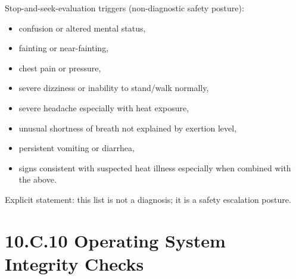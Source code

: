 \documentclass[10pt]{article}
\begin{document}
Stop-and-seek-evaluation triggers (non-diagnostic safety posture):

\begin{itemize}
\item confusion or altered mental status,
\item fainting or near-fainting,
\item chest pain or pressure,
\item severe dizziness or inability to stand/walk normally,
\item severe headache especially with heat exposure,
\item unusual shortness of breath not explained by exertion level,
\item persistent vomiting or diarrhea,
\item signs consistent with suspected heat illness especially when combined with the above.
\end{itemize}

Explicit statement: this list is not a diagnosis; it is a safety escalation posture.

\newpage

\section*{10.C.10 Operating System Integrity Checks}
{}
\end{document}
